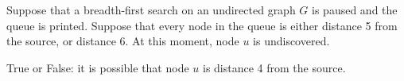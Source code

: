 \begin{prob}

    Suppose that a breadth-first search on an undirected graph $G$ is paused
    and the queue is printed. Suppose that every node in the queue is either
    distance 5 from the source, or distance 6. At this moment, node $u$ is
    undiscovered.

    True or False: it is possible that
    node $u$ is distance 4 from the source.

    \tF{}

\end{prob}
